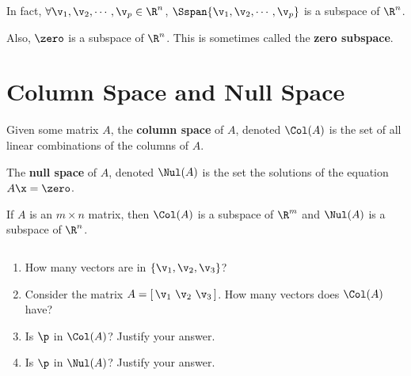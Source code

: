 \begin{note}
  \label{nte:span_is_a_subspace}

  In fact, $\forall \v_1,\v_2,\cdots,\v_p \in \R^n$,
  $\Sspan\{\v_1,\v_2,\cdots,\v_p\}$ is a subspace of $\R^n$.

  Also, $\zero$ is a subspace of $\R^n$. This is sometimes called the \textbf{zero
  subspace}.
\end{note}


\section{Column Space and Null Space}
\label{sec:column_space_and_null_space}

\begin{definition}
  \label{def:column_and_null_space}

  Given some matrix $A$, the \textbf{column space} of $A$, denoted $\Col(A)$ is
  the set of all linear combinations of the columns of $A$.

  The \textbf{null space} of $A$, denoted $\Nul(A)$ is the set the solutions of
  the equation $A\x = \zero$.
\end{definition}

\begin{purpleframe}
  \label{prpl:column_and_null_space}

  If $A$ is an $m \times n$ matrix, then $\Col(A)$ is a subspace of $\R^m$ and
  $\Nul(A)$ is a subspace of $\R^n$.
\end{purpleframe}

\begin{question}
  \label{qst:column_and_null_space} $ $

  \begin{enumerate}
    \label{enum:column_and_null_space_qst}

    \item How many vectors are in $\{\v_1,\v_2,\v_3\}$?
    \item Consider the matrix $A = [\,\v_1~\v_2~\v_3\,]$. How many vectors does $\Col(A)$ have?
    \item Is $\p$ in $\Col(A)$? Justify your answer.
    \item Is $\p$ in $\Nul(A)$? Justify your answer.
  \end{enumerate}
\end{question}

